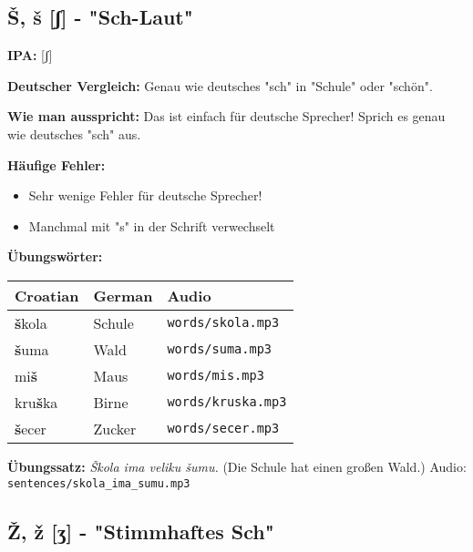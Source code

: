 \subsection{Š, š [ʃ] - "Sch-Laut"}

\begin{tcolorbox}[colback=lightblue!30, colframe=croatianblue, title=\textbf{Š, š}]

\textbf{IPA:} [ʃ]

\textbf{Deutscher Vergleich:}
Genau wie deutsches "sch" in "Schule" oder "schön".

\textbf{Wie man ausspricht:}
Das ist einfach für deutsche Sprecher! Sprich es genau wie deutsches "sch" aus.

\textbf{Häufige Fehler:}
\begin{itemize}
    \item Sehr wenige Fehler für deutsche Sprecher!
    \item Manchmal mit "s" in der Schrift verwechselt
\end{itemize}

\textbf{Übungswörter:}
\begin{tabular}{lll}
\textbf{Croatian} & \textbf{German} & \textbf{Audio} \\
\midrule
\textbf{š}kola & Schule & \texttt{words/skola.mp3} \\
\textbf{š}uma & Wald & \texttt{words/suma.mp3} \\
mi\textbf{š} & Maus & \texttt{words/mis.mp3} \\
kru\textbf{š}ka & Birne & \texttt{words/kruska.mp3} \\
\textbf{š}ecer & Zucker & \texttt{words/secer.mp3} \\
\end{tabular}

\textbf{Übungssatz:}
\textit{Škola ima veliku šumu.}
(Die Schule hat einen großen Wald.)
Audio: \texttt{sentences/skola\_ima\_sumu.mp3}

\end{tcolorbox}

\subsection{Ž, ž [ʒ] - "Stimmhaftes Sch"}

